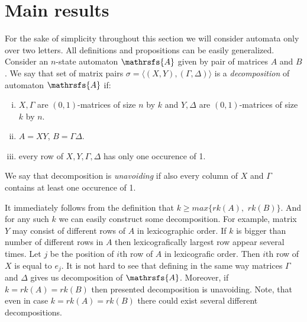 \documentclass[11pt]{llncs}
\newcommand{\A}{\mathrsfs{A}}
\newcommand{\G}{\Gamma}
\newcommand{\D}{\Delta}
\newcommand{\rk}{rk}
\begin{document}
\section{Main results}
For the sake of simplicity throughout this section we will consider automata only
over two letters. All definitions and propositions can be easily generalized.
Consider an $n$-state automaton $\A$ given by pair of matrices $A$ and $B$.
We say that set of matrix pairs $\sigma = \langle(X,Y), (\G,\D)\rangle$ is
a \emph{decomposition} of automaton $\A$ if:
\begin{enumerate}[(i)]
\item $X, \G$ are $(0,1)$-matrices of size $n$ by $k$ and $Y, \D$ are
$(0,1)$-matrices of size $k$ by $n$.
\item $A = XY$, $B = \G\D$.
\item every row of $X,Y,\G,\D$ has only one occurence of 1.
\end{enumerate}
We say that decomposition is \emph{unavoiding} if also every column of $X$ and 
$\G$ contains at least one occurence of 1.

It immediately follows from the definition that $k \geq max\{\rk(A),$ $\rk(B)\}$.
And for any such $k$ we can easily construct some decomposition. 
For example, matrix $Y$ may consist of different rows of $A$ in lexicographic order.
If $k$ is bigger than number of different rows in $A$ then lexicografically largest row 
appear several times. Let $j$ be the position of $i$th row of $A$ in lexicografic order.
Then $i$th row of $X$ is equal to $e_j$. It is not hard to see that defining in the 
same way matrices $\G$ and $\D$ gives us decomposition of $\A$. Moreover,
if $k = \rk(A) = \rk(B)$ then presented decomposition is unavoiding. Note, that even in case
$k = \rk(A) = \rk(B)$ there could exist several different decompositions.
\end{document}
